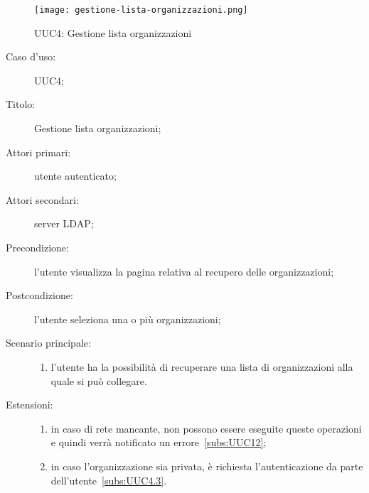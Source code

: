 \documentclass[../../../analisi-dei-requisiti.tex]{subfiles}
\begin{document}
\begin{figure}[H]
  \centering
  \texttt{[image: gestione-lista-organizzazioni.png]}
  \caption{UUC4: Gestione lista organizzazioni}%
  \label{fig:uuc4}
\end{figure}

\begin{description}
  \item[Caso d’uso:] UUC4;
  \item[Titolo:] Gestione lista organizzazioni;
  \item[Attori primari:] utente autenticato;
  \item[Attori secondari:] server LDAP\@;
  \item[Precondizione:] l'utente visualizza la pagina relativa al recupero delle organizzazioni;
  \item[Postcondizione:] l'utente seleziona una o più organizzazioni;
  \item[Scenario principale:]
        \begin{enumerate}
          \item l'utente ha la possibilità di recuperare una lista di organizzazioni alla quale si può collegare.
        \end{enumerate}
  \item[Estensioni:]
        \begin{enumerate}
          \item in caso di rete mancante, non possono essere eseguite queste operazioni e quindi verrà notificato un errore~\ref{subs:UUC12};
          \item in caso l'organizzazione sia privata, è richiesta l'autenticazione da parte dell'utente~\ref{subs:UUC4.3}.
        \end{enumerate}
\end{description}
\end{document}
